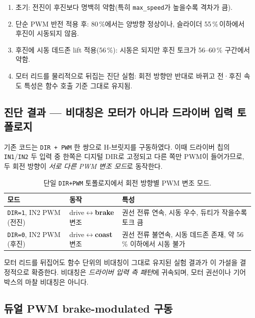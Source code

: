 \documentclass[11pt, oneside]{article}
\begin{document}
\begin{enumerate}
  \item 초기: 전진이 후진보다 명백히 약함(특히 \texttt{max\_speed}가
        높을수록 격차가 큼).
  \item 단순 PWM 반전 적용 후: 80\,\%에서는 양방향 정상이나, 슬라이더
        55\,\%\,이하에서 후진이 시동되지 않음.
  \item 후진에 시동 데드존 lift 적용(56\,\%): 시동은 되지만 후진 토크가
        56--60\,\% 구간에서 약함.
  \item 모터 리드를 물리적으로 뒤집는 진단 실험: 회전 방향만 반대로
        바뀌고 전·후진 속도 특성은 함수 호출 기준 그대로 유지됨.
\end{enumerate}

\subsection{진단 결과 --- 비대칭은 모터가 아니라 드라이버 입력 토폴로지}

기존 코드는 \texttt{DIR + PWM} 한 쌍으로 H-브릿지를 구동하였다. 이때
드라이버 칩의 \texttt{IN1}/\texttt{IN2} 두 입력 중 한쪽은 디지털 DIR로
고정되고 다른 쪽만 PWM이 들어가므로, 두 회전 방향이 \emph{서로 다른
PWM 변조 모드}로 동작한다.

\begin{table}[h]
\centering
\small
\begin{tabularx}{\linewidth}{@{}lXX@{}}
\toprule
모드 & 동작 & 특성 \\
\midrule
\texttt{DIR=1}, IN2 PWM (전진) & drive$\leftrightarrow$\textbf{brake} 변조 & 권선 전류 연속, 시동 우수, 듀티가 작을수록 토크 큼 \\
\texttt{DIR=0}, IN2 PWM (후진) & drive$\leftrightarrow$\textbf{coast} 변조 & 권선 전류 불연속, 시동 데드존 존재, 약 56\,\% 이하에서 시동 불가 \\
\bottomrule
\end{tabularx}
\caption{단일 \texttt{DIR+PWM} 토폴로지에서 회전 방향별 PWM 변조 모드.}
\end{table}

모터 리드를 뒤집어도 함수 단위의 비대칭이 그대로 유지된 실험 결과가
이 가설을 결정적으로 확증한다. 비대칭은 \emph{드라이버 입력 측 패턴}에
귀속되며, 모터 권선이나 기어박스의 마찰 비대칭은 아니다.

\subsection{듀얼 PWM brake-modulated 구동}
\end{document}
